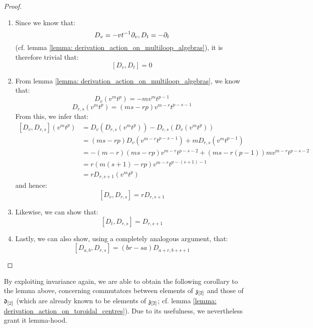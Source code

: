             \begin{proof}
                \begin{enumerate}
                    \item Since we know that:
                        $$D_v = -vt^{-1} \partial_v, D_t = -\partial_t$$
                    (cf. lemma \ref{lemma: derivation_action_on_multiloop_algebras}), it is therefore trivial that:
                        $$[D_v, D_t] = 0$$
                    \item From lemma \ref{lemma: derivation_action_on_multiloop_algebras}, we know that:
                        $$D_v(v^m t^p) = -m v^m t^{p - 1}$$
                        $$D_{r, s}(v^m t^p) = ( ms - rp ) v^{m - r} t^{p - s - 1}$$
                    From this, we infer that:
                        $$
                            \begin{aligned}
                                [D_v, D_{r, s}](v^m t^p) & = D_v( D_{r, s}(v^m t^p) ) - D_{r, s}( D_v(v^m t^p) )
                                \\
                                & = (ms - rp) D_v( v^{m - r} t^{p - s - 1} ) + m D_{r, s}( v^m t^{p - 1} )
                                \\
                                & = -(m - r)(ms - rp) v^{m - r} t^{p - s - 2} + (ms - r(p - 1)) m v^{m - r} t^{p - s - 2}
                                \\
                                & = r(m(s + 1) - rp) v^{m - r} t^{p - (s + 1) - 1}
                                \\
                                & = r D_{r, s + 1}(v^m t^p)
                            \end{aligned}
                        $$
                    and hence:
                        $$[D_v, D_{r, s}] = r D_{r, s + 1}$$
                    \item Likewise, we can show that:
                        $$[D_t, D_{r, s}] = D_{r, s + 1}$$
                    \item Lastly, we can also show, using a completely analogous argument, that:
                        $$[D_{a, b}, D_{r, s}] = (br - sa) D_{a + r, b + s + 1}$$
                \end{enumerate}
            \end{proof}
        By exploiting invariance again, we are able to obtain the following corollary to the lemma above, concerning commutators between elements of $\mathfrak{z}_{[2]}$ and those of $\mathfrak{d}_{[2]}$ (which are already known to be elements of $\mathfrak{z}_{[2]}$; cf. lemma \ref{lemma: derivation_action_on_toroidal_centres}). Due to its usefulness, we nevertheless grant it lemma-hood.
